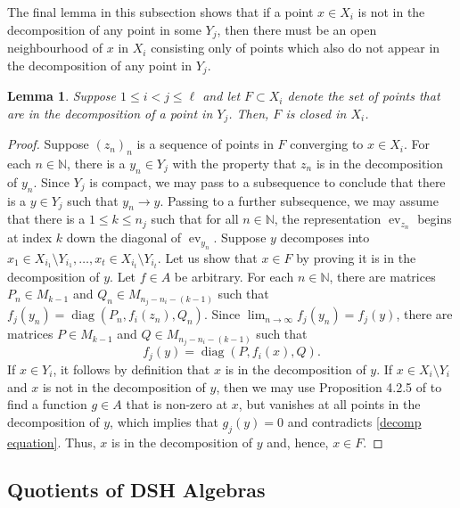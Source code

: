 \documentclass[12pt]{amsart}
\numberwithin{equation}{section}
\newtheorem{lemma}[theorem]{Lemma}
\theoremstyle{definition}
\theoremstyle{remark}
\newcommand{\diag}{\operatorname{diag}}
\newcommand{\ev}{\operatorname{ev}}
\newcommand{\NN}{\mathbb{N}}
\begin{document}
The final lemma in this subsection shows that if a point $x\in X_{i}$ is not in the decomposition of any point in some $Y_{j}$, then there must be an open neighbourhood of $x$ in $X_{i}$ consisting only of points which also do not appear in the decomposition of any point in $Y_{j}$. 

\begin{lemma}
	\label{not decomposition}
	Suppose $1\leq i < j \leq\ell$ and let $F\subset X_{i}$ denote the set of points that are in the decomposition of a point in $Y_{j}$. Then, $F$ is closed in $X_{i}$. 
\end{lemma}

\begin{proof}
	Suppose $(z_{n})_{n}$ is a sequence of points in $F$ converging to $x\in X_{i}$. For each $n\in\NN$, there is a $y_{n}\in Y_{j}$ with the property that $z_{n}$ is in the decomposition of $y_{n}$. Since $Y_{j}$ is compact, we may pass to a subsequence to conclude that there is a $y\in Y_{j}$ such that $y_{n}\to y$. Passing to a further subsequence, we may assume that there is a $1\leq k\leq n_{j}$ such that for all $n\in \NN$, the representation $\ev_{z_{n}}$ begins at index $k$ down the diagonal of $\ev_{y_{n}}$. Suppose $y$ decomposes into $x_{1}\in X_{i_{1}}\setminus Y_{i_{1}},\ldots,x_{t}\in X_{i_{t}}\setminus Y_{i_{t}}$. Let us show that $x\in F$ by proving it is in the decomposition of $y$. Let $f\in A$ be arbitrary. For each $n\in\NN$, there are matrices $P_{n}\in M_{k-1}$ and $Q_{n}\in M_{n_{j}-n_{i}-(k-1)}$ such that $f_{j}(y_{n})=\diag(P_{n},f_{i}(z_{n}),Q_{n})$. Since $\lim_{n\to\infty}f_{j}(y_{n})=f_{j}(y)$, there are matrices $P\in M_{k-1}$ and $Q\in M_{n_{j}-n_{i}-(k-1)}$ such that 
	\begin{equation}
	\label{decomp equation}
	f_{j}(y)=\diag(P,f_{i}(x),Q).
	\end{equation}
	If $x\in Y_{i}$, it follows by definition that $x$ is in the decomposition of $y$. If $x\in X_{i}\setminus Y_{i}$ and $x$ is not in the decomposition of $y$, then we may use Proposition 4.2.5 of \cite{dix} to find a function $g\in A$ that is non-zero at $x$, but vanishes at all points in the decomposition of $y$, which implies that $g_{j}(y)=0$ and contradicts \autoref{decomp equation}. Thus, $x$ is in the decomposition of $y$ and, hence, $x\in F$.
\end{proof}


\subsection{Quotients of DSH Algebras}
\label{quotients}
\end{document}
